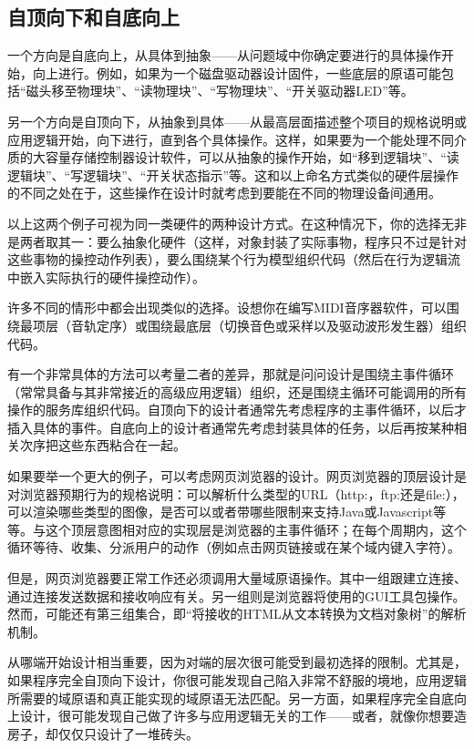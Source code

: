 \documentclass[12pt,oneside]{book}
\begin{document}
\subsection{自顶向下和自底向上}
一个方向是自底向上，从具体到抽象——从问题域中你确定要进行的具体操作开始，向上进行。例如，如果为一个磁盘驱动器设计固件，一些底层的原语可能包括“磁头移至物理块”、“读物理块”、“写物理块”、“开关驱动器LED”等。

另一个方向是自顶向下，从抽象到具体——从最高层面描述整个项目的规格说明或应用逻辑开始，向下进行，直到各个具体操作。这样，如果要为一个能处理不同介质的大容量存储控制器设计软件，可以从抽象的操作开始，如“移到逻辑块”、“读逻辑块”、“写逻辑块”、“开关状态指示”等。这和以上命名方式类似的硬件层操作的不同之处在于，这些操作在设计时就考虑到要能在不同的物理设备间通用。

以上这两个例子可视为同一类硬件的两种设计方式。在这种情况下，你的选择无非是两者取其一：要么抽象化硬件（这样，对象封装了实际事物，程序只不过是针对这些事物的操控动作列表），要么围绕某个行为模型组织代码（然后在行为逻辑流中嵌入实际执行的硬件操控动作）。

许多不同的情形中都会出现类似的选择。设想你在编写MIDI音序器软件，可以围绕最项层（音轨定序）或围绕最底层（切换音色或采样以及驱动波形发生器）组织代码。

有一个非常具体的方法可以考量二者的差异，那就是问问设计是围绕主事件循环（常常具备与其非常接近的高级应用逻辑）组织，还是围绕主循环可能调用的所有操作的服务库组织代码。自顶向下的设计者通常先考虑程序的主事件循环，以后才插入具体的事件。自底向上的设计者通常先考虑封装具体的任务，以后再按某种相关次序把这些东西粘合在一起。

如果要举一个更大的例子，可以考虑网页浏览器的设计。网页浏览器的顶层设计是对浏览器预期行为的规格说明：可以解析什么类型的URL（http:，ftp:还是file:），可以渲染哪些类型的图像，是否可以或者带哪些限制来支持Java或Javascript等等。与这个顶层意图相对应的实现层是浏览器的主事件循环；在每个周期内，这个循环等待、收集、分派用户的动作（例如点击网页链接或在某个域内键入字符）。

但是，网页浏览器要正常工作还必须调用大量域原语操作。其中一组跟建立连接、通过连接发送数据和接收响应有关。另一组则是浏览器将使用的GUI工具包操作。然而，可能还有第三组集合，即“将接收的HTML从文本转换为文档对象树”的解析机制。

从哪端开始设计相当重要，因为对端的层次很可能受到最初选择的限制。尤其是，如果程序完全自顶向下设计，你很可能发现自己陷入非常不舒服的境地，应用逻辑所需要的域原语和真正能实现的域原语无法匹配。另一方面，如果程序完全自底向上设计，很可能发现自己做了许多与应用逻辑无关的工作——或者，就像你想要造房子，却仅仅只设计了一堆砖头。
\end{document}
